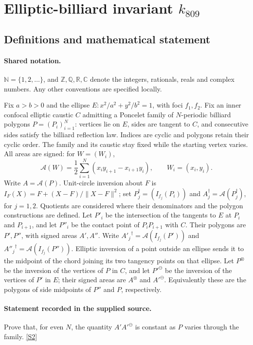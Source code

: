 \documentclass[11pt]{article}
\newcommand{\sref}[2]{\hyperlink{source:#1:#2}{[S#2]}}
\begin{document}
\section{Elliptic-billiard invariant $k_{809}$}\label{statement}

\subsection{Definitions and mathematical statement}

\paragraph{Shared notation.}$\mathbb N=\{1,2,\ldots\}$, and $\mathbb Z,\mathbb Q,\mathbb R,\mathbb C$ denote the integers, rationals, reals and complex numbers. Any other conventions are specified locally.


Fix $a>b>0$ and the ellipse $E:x^2/a^2+y^2/b^2=1$, with foci $f_1,f_2$. Fix an inner confocal elliptic caustic $C$ admitting a Poncelet family of $N$-periodic billiard polygons $P=(P_i)_{i=1}^N$: vertices lie on $E$, sides are tangent to $C$, and consecutive sides satisfy the billiard reflection law. Indices are cyclic and polygons retain their cyclic order. The family and its caustic stay fixed while the starting vertex varies. All areas are signed: for $W=(W_i)$,
\[\mathcal A(W)=\frac12\sum_{i=1}^N(x_i y_{i+1}-x_{i+1}y_i),\qquad W_i=(x_i,y_i).\]
Write $A=\mathcal A(P)$. Unit-circle inversion about $F$ is $I_F(X)=F+(X-F)/\lVert X-F\rVert^2$; set $P_j^\dagger=(I_{f_j}(P_i))$ and $A_j^\dagger=\mathcal A(P_j^\dagger)$, for $j=1,2$. Quotients are considered where their denominators and the polygon constructions are defined. Let $P'_i$ be the intersection of the tangents to $E$ at $P_i$ and $P_{i+1}$, and let $P''_i$ be the contact point of $P_iP_{i+1}$ with $C$. Their polygons are $P',P''$, with signed areas $A',A''$. Write ${A'_j}^\dagger=\mathcal A(I_{f_j}(P'))$ and ${A''_j}^\dagger=\mathcal A(I_{f_j}(P''))$. Elliptic inversion of a point outside an ellipse sends it to the midpoint of the chord joining its two tangency points on that ellipse. Let $P^\otimes$ be the inversion of the vertices of $P$ in $C$, and let ${P'}^\ominus$ be the inversion of the vertices of $P'$ in $E$; their signed areas are $A^\otimes$ and ${A'}^\ominus$. Equivalently these are the polygons of side midpoints of $P''$ and $P$, respectively.
\paragraph{Statement recorded in the supplied source.}
Prove that, for even $N$, the quantity $A'{A'}^\ominus$ is constant as $P$ varies through the family. \sref{statement}{2}
\end{document}
